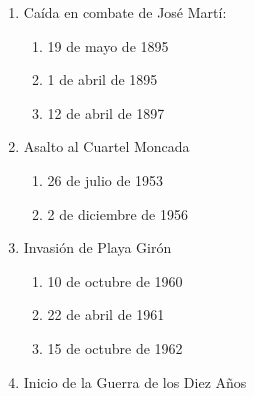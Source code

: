 \documentclass[twocolumn]{article}
\begin{document}
\begin{enumerate}



  \item Caída en combate de José Martí:

  \begin{enumerate}
   
   \item 19 de mayo de 1895
   
   \item 1 de abril de 1895
   
   \item 12 de abril de 1897
   
  \end{enumerate}



  \item Asalto al Cuartel Moncada

  \begin{enumerate}
   
   \item 26 de julio de 1953
   
   \item 2 de diciembre de 1956
   
  \end{enumerate}



  \item Invasión de Playa Girón

  \begin{enumerate}
   
   \item 10 de octubre de 1960
   
   \item 22 de abril de 1961
   
   \item 15 de octubre de 1962
   
  \end{enumerate}



  \item Inicio de la Guerra de los Diez Años


\end{enumerate}
\end{document}
